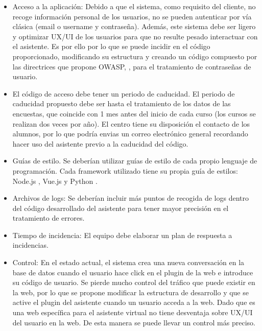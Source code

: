 \begin{itemize}
    \item Acceso a la aplicación: Debido a que el sistema, como requisito del cliente, no recoge información personal de los usuarios, no se pueden autenticar por vía clásica (email o username y contraseña). Además, este sistema debe ser ligero y optimizar UX/UI de los usuarios para que no resulte pesado interactuar con el asistente. Es por ello por lo que se puede incidir en el código proporcionado, modificando su estructura y creando un código compuesto por las directrices que propone OWASP, \cite{owasp}, para el tratamiento de contraseñas de usuario.
    \item El código de acceso debe tener un periodo de caducidad. El periodo de caducidad propuesto debe ser hasta el tratamiento de los datos de las encuestas, que coincide con 1 mes antes del inicio de cada curso (los cursos se realizan dos veces por año). El centro tiene su disposición el contacto de los alumnos, por lo que podría envias un correo electrónico general recordando hacer uso del asistente previo a la caducidad del código.
    \item Guías de estilo. Se deberían utilizar guías de estilo de cada propio lenguaje de programación. Cada framework utilizado tiene su propia guía de estilos: Node.js \cite{nodejsstyleguide}, Vue.js \cite{vuejsstyleguide} y Python \cite{pythonstyleguide:2001}.
    \item Archivos de logs: Se deberían incluir más puntos de recogida de logs dentro del código desarrollado del asistente para tener mayor precisión en el tratamiento de errores.
    \item Tiempo de incidencia: El equipo debe elaborar un plan de respuesta a incidencias. 
    \item Control: En el estado actual, el sistema crea una nueva conversación en la base de datos cuando el usuario hace click en el plugin de la web e introduce su código de usuario. Se pierde mucho control del tráfico que puede existir en la web, por lo que se propone modificar la estructura de desarrollo y que se active el plugin del asistente cuando un usuario acceda a la web. Dado que es una web específica para el asistente virtual no tiene desventaja sobre UX/UI del usuario en la web. De esta manera se puede llevar un control más preciso.
\end{itemize}



 








